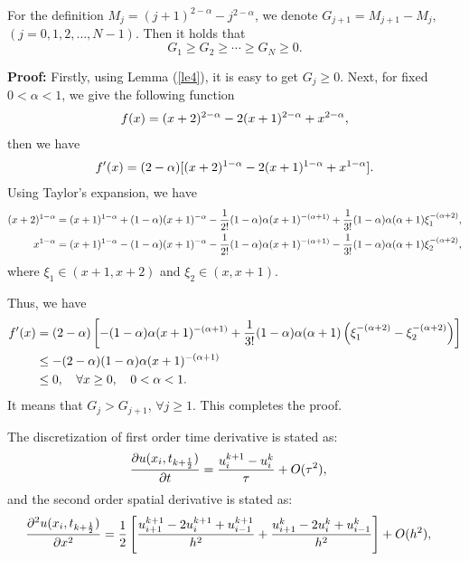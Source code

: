\documentclass[3p,times]{elsarticle}
\begin{document}
\begin{lem}\label{le5}
For the definition $M_j=(j+1)^{2-\alpha}-j^{2-\alpha}$, we denote $G_{j+1}=M_{j+1}-M_j$, $(j=0,1,2,\ldots,N-1)$. Then it holds that
\begin{equation*}
G_1\geq G_2\geq \cdots\geq G_N\geq0.
\end{equation*}
\end{lem}
\textbf{Proof:} Firstly, using Lemma (\ref{le4}), it is easy to get $G_j\geq0$. Next, for fixed $0<\alpha<1$, we give the following function
\begin{equation*}
\aligned
f(x)=(x+2)^{2-\alpha}-2(x+1)^{2-\alpha}+x^{2-\alpha},
\endaligned
\end{equation*}
then we have
\begin{equation*}
\aligned
f'(x)=(2-\alpha)[(x+2)^{1-\alpha}-2(x+1)^{1-\alpha}+x^{1-\alpha}].
\endaligned
\end{equation*}
Using Taylor's expansion, we have
\begin{equation*}
\aligned
(x+2)^{1-\alpha}&=(x+1)^{1-\alpha}+(1-\alpha)(x+1)^{-\alpha}-\frac{1}{2!}(1-\alpha)\alpha (x+1)^{-(\alpha+1)}+\frac{1}{3!}(1-\alpha)\alpha(\alpha+1)\xi_1^{-(\alpha+2)},\\
x^{1-\alpha}&=(x+1)^{1-\alpha}-(1-\alpha)(x+1)^{-\alpha}-\frac{1}{2!}(1-\alpha)\alpha (x+1)^{-(\alpha+1)}-\frac{1}{3!}(1-\alpha)\alpha(\alpha+1)\xi_2^{-(\alpha+2)},
\endaligned
\end{equation*}
where $\xi_1\in(x+1,x+2)$ and $\xi_2\in(x,x+1)$.

Thus, we have
\begin{equation*}
\aligned
f'(x)&=(2-\alpha)\left[-(1-\alpha)\alpha (x+1)^{-(\alpha+1)}+\frac{1}{3!}(1-\alpha)\alpha(\alpha+1)\left(\xi_1^{-(\alpha+2)}-\xi_2^{-(\alpha+2)}\right)\right]\\
&\leq-(2-\alpha)(1-\alpha)\alpha(x+1)^{-(\alpha+1)}\\
&\leq0,\quad \forall x\geq0,\quad 0<\alpha<1.
\endaligned
\end{equation*}
It means that $G_j>G_{j+1}$, $\forall j\geq1$. This completes the proof.

The discretization of first order time derivative is stated as:
\begin{equation}\label{e12}
\aligned
&\frac{\partial u(x_i,t_{k+\frac{1}{2}})}{\partial t}=\frac{u_i^{k+1}-u_i^k}{\tau}+O(\tau^2),
\endaligned
\end{equation}
and the second order spatial derivative is stated as:
\begin{equation}\label{e13}
\aligned
&\frac{\partial^2 u(x_i,t_{k+\frac{1}{2}})}{\partial x^2}=\frac{1}{2}\left[\frac{u_{i+1}^{k+1}-2u_i^{k+1}+u_{i-1}^{k+1}}{h^2}+\frac{u_{i+1}^{k}-2u_i^k+u_{i-1}^{k}}{h^2}\right]+O(h^2),
\endaligned
\end{equation}
\end{document}
